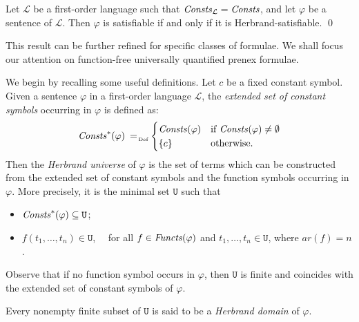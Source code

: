 \documentclass[a4paper]{llncs}
\newcommand{\Lang}{\ensuremath{\mathcal{L}\xspace}} %
\newcommand{\LangConsts}{\Consts_{\Lang}}
\newcommand{\Univ}{\mathtt{U}}
\newcommand{\ar}{\mathit{ar}}
\begin{document}
\begin{theorem}\label{HERSENT}
Let $\Lang$ be a first-order
language such that $\LangConsts=\Consts$, and let $\varphi$ be a sentence of
$\Lang$.
Then $\varphi$ is satisfiable if and only if it is Herbrand-satisfiable.
\qed
\end{theorem}
%
This result can be further refined for specific classes of formulae.
We shall focus our attention on function-free
universally quantified prenex formulae.

We begin by recalling some useful
definitions. Let $c$ be a fixed constant symbol. Given a sentence 
$\varphi$ in a first-order language $\Lang$, the \emph{extended set 
of constant symbols} occurring in $\varphi$ is defined as:
\[
\Consts^*(\varphi) \defAs
\begin{cases}
\Consts(\varphi) & \text{if } \Consts(\varphi) \neq \emptyset\\
\{c\} & \text{otherwise.}
\end{cases}
\]
Then the \emph{Herbrand universe} of $\varphi$ is the set of terms which can
be constructed from the extended set of constant symbols and the 
function symbols occurring in $\varphi$.
More precisely, it is the minimal set $\Univ$ such that
\begin{itemize}
\item $\Consts^*(\varphi) \subseteq \Univ$;
%

\item $f(t_1, \ldots, t_n) \in \Univ$, ~~for all $f \in 
\mathit{Functs}(\varphi)$ and $t_1, \ldots, t_n \in \Univ$, where $\ar(f)=n$.
\end{itemize}
%
Observe that if no function symbol occurs in $\varphi$, then $\Univ$ 
is finite and coincides with the extended set of constant symbols of 
$\varphi$.

Every nonempty finite subset of $\Univ$ is said to be a
\emph{Herbrand domain} of $\varphi$.
\end{document}
